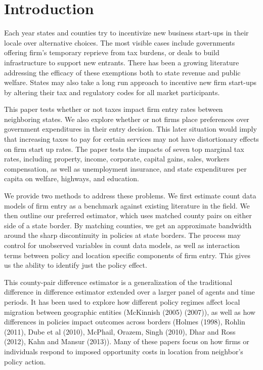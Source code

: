 
\section{Introduction}

Each year states and counties try to incentivize new business start-ups in their locale over alternative choices. The most visible cases include governments offering firm's temporary reprieve from tax burdens, or deals to build infrastructure to support new entrants. There has been a growing literature addressing the efficacy of these exemptions both to state revenue and public welfare. States may also take a long run approach to incentive new firm start-ups by altering their tax and regulatory codes for all market participants. 

This paper tests whether or not taxes impact firm entry rates between neighboring states. We also explore whether or not firms place preferences over government expenditures in their entry decision. This later situation would imply that increasing taxes to pay for certain services may not have distortionary effects on firm start up rates. The paper tests the impacts of seven top marginal tax rates, including property, income, corporate, capital gains, sales, workers compensation, as well as unemployment insurance, and state expenditures per capita on welfare, highways, and education.

We provide two methods to address these problems. We first estimate count data models of firm entry as a benchmark against existing literature in the field. We then outline our preferred estimator, which uses matched county pairs on either side of a state border. By matching counties, we get an approximate bandwidth around the sharp discontinuity in policies at state borders. The process may control for unobserved variables in count data models, as well as interaction terms between policy and location specific components of firm entry. This gives us the ability to identify just the policy effect.

This county-pair difference estimator is a generalization of the traditional difference in difference estimator extended over a larger panel of agents and time periods. It has been used to explore how different policy regimes affect local migration between geographic entities (McKinnish (2005) (2007)), as well as how differences in policies impact outcomes across borders (Holmes (1998), Rohlin (2011), Dube et al (2010), McPhail, Orazem, Singh (2010), Dhar and Ross (2012),  Kahn and Mansur (2013)). Many of these papers focus on how firms or individuals respond to imposed opportunity costs in location from neighbor's policy action.

